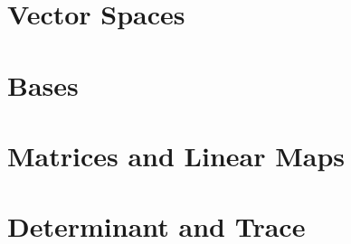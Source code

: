 \documentclass[british,11pt,a4paper]{report}
\begin{document}
\maketitle
\tableofcontents

\chapter{Vector Spaces}

\chapter{Bases}

\chapter{Matrices and Linear Maps}

\chapter{Determinant and Trace}

\end{document}
